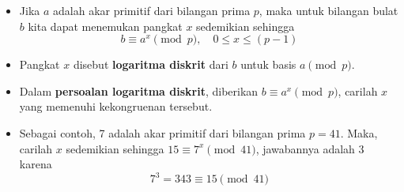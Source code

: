 \documentclass{article}
\begin{document}

\begin{itemize}
  \item Jika $a$ adalah akar primitif dari bilangan prima $p$, maka untuk bilangan bulat $b$ kita dapat menemukan pangkat $x$ sedemikian sehingga
  \[ b \equiv a^x \pmod{p}, \quad 0 \le x \le (p-1) \]
  \item Pangkat $x$ disebut \textbf{logaritma diskrit} dari $b$ untuk basis $a \pmod{p}$.
  \item Dalam \textbf{persoalan logaritma diskrit}, diberikan $b \equiv a^x \pmod{p}$, carilah $x$ yang memenuhi kekongruenan tersebut.
  \item Sebagai contoh, 7 adalah akar primitif dari bilangan prima $p = 41$. Maka, carilah $x$ sedemikian sehingga $15 \equiv 7^x \pmod{41}$, jawabannya adalah 3 karena
  \[ 7^3 = 343 \equiv 15 \pmod{41} \]
\end{itemize}
\end{document}

